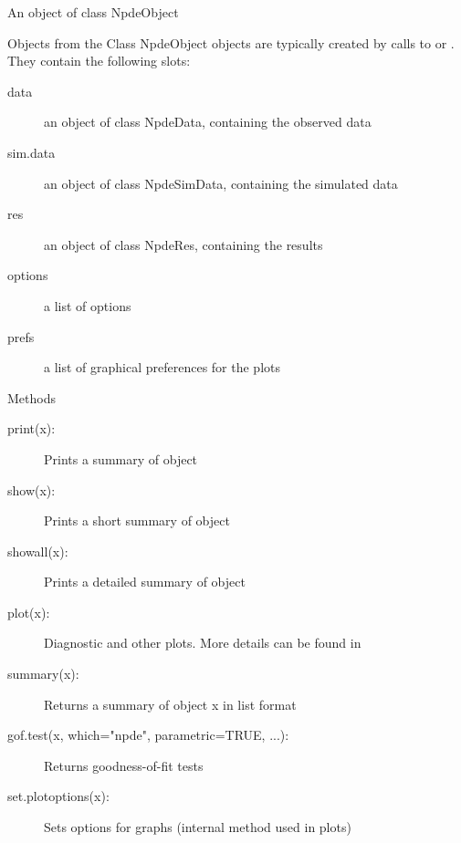 \documentclass[a4paper]{book}
\begin{document}
\aliasA{[,NpdeObject-method}{NpdeObject-class}{[,NpdeObject.Rdash.method}
\aliasA{[<\Rdash{},NpdeObject-method}{NpdeObject-class}{[<.Rdash.,NpdeObject.Rdash.method}
%
\begin{Description}\relax
An object of class NpdeObject
\end{Description}
%
\begin{Section}{Objects from the Class}
NpdeObject objects are typically created by calls to  or . They contain the following slots:

\begin{description}

\item[data] an object of class NpdeData, containing the observed data
\item[sim.data] an object of class NpdeSimData, containing the simulated data
\item[res] an object of class NpdeRes, containing the results
\item[options] a list of options
\item[prefs] a list of graphical preferences for the plots

\end{description}

\end{Section}
%
\begin{Section}{Methods}

\begin{description}

\item[print(x):] Prints a summary of object
\item[show(x):] Prints a short summary of object
\item[showall(x):] Prints a detailed summary of object
\item[plot(x):] Diagnostic and other plots. More details can be found in 
\item[summary(x):] Returns a summary of object x in list format
\item[gof.test(x, which="npde", parametric=TRUE, ...):] Returns goodness-of-fit tests
\item[set.plotoptions(x):] Sets options for graphs (internal method used in plots)

\end{description}

\end{Section}
\end{document}
